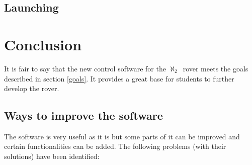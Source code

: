\documentclass[english,inz,shortabstract]{iithesis}
\newcommand{\rovername}{$\aleph_2$\ }
\begin{document}
\section{Launching}

\chapter{Conclusion}
It is fair to say that the new control software for the \rovername rover meets the goals described in section \ref{goals}. It provides a great base for students to further develop the rover. 

\section{Ways to improve the software}
The software is very useful as it is but some parts of it can be improved and certain functionalities can be added. The following problems (with their solutions) have been identified: 
\end{document}
